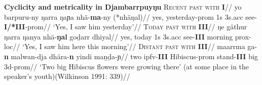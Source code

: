 \documentclass[12pt]{article}
\begin{document}
\pex \textbf{Cyclicity and metricality in Djambarrpuyŋu}
\a{}\begingl\glpreamble\textsc{Recent past with \textbf{I}}//
\gla yo barpuru-ny ŋarra ŋaɲa nhä-\textbf{ma}-ny (*nhäŋal)//
\glb	yes, yesterday{\sc-prom} 1s 3s{\sc.acc} see-\textbf{I/*III}-{\sc prom}//
	\glft`Yes, I saw him yesterday'\footnotemark//\endgl
\a\begingl\glpreamble\textsc{Today past with \textbf{III}}//
\gla ŋe gäthur ŋarra ŋanya nhä-\textbf{ŋal} goḏarr dhiyal//
\glb	yes, today 1s 3s{\sc.acc} see-\textbf{III} morning {\sc prox-loc}//
	\glft`Yes, I saw him here this morning'//\endgl
	\a\begingl\glpreamble\textsc{Distant past with \textbf{III}}//
	\gla maarrma ga-\textbf{n} malwan-dja dhära-\textbf{n} yindi maṉḏa-ɲ//
	\glb two {\sc ipfv-\textbf{III}} Hibiscus-{\sc prom} stand-\textbf{III} big 3d-{\sc prom}//
	\glft`Two big Hibiscus flowers were growing there' (at some place in the speaker's youth)\hfill(Wilkinson 1991: 339)//
	\endgl
\xe
{}
\end{document}
